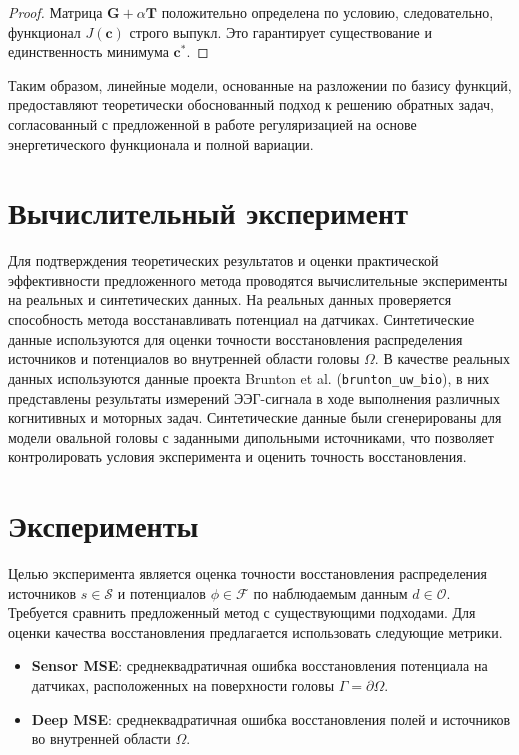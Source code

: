 \documentclass[a4paper,14pt,oneside,openany]{extarticle}
\begin{document}
\begin{proof}
Матрица $\mathbf{G} + \alpha \mathbf{T}$ положительно определена по условию, следовательно, функционал 
$J(\mathbf{c})$ строго выпукл. Это гарантирует существование и единственность минимума $\mathbf{c}^*$.
\end{proof}

Таким образом, линейные модели, основанные на разложении по базису функций, предоставляют теоретически 
обоснованный подход к решению обратных задач, согласованный с предложенной в работе регуляризацией на основе энергетического функционала и полной вариации.

\newpage
\section{Вычислительный эксперимент}

Для подтверждения теоретических результатов и оценки практической эффективности предложенного 
метода проводятся вычислительные эксперименты на реальных и синтетических данных. 
На реальных данных проверяется способность метода восстанавливать потенциал на датчиках. 
Синтетические данные используются для оценки точности 
восстановления распределения источников и потенциалов во внутренней области головы $\Omega$.
В качестве реальных данных используются данные проекта Brunton et al. (\texttt{brunton\_uw\_bio}), 
в них представлены результаты измерений ЭЭГ-сигнала в ходе выполнения различных когнитивных и 
моторных задач.
Синтетические данные были сгенерированы для модели овальной головы с заданными дипольными 
источниками, что позволяет контролировать условия эксперимента и оценить точность восстановления.

\newpage
\section{Эксперименты}
\label{sec:experiments}

 Целью эксперимента является оценка точности восстановления распределения источников $s \in \mathcal{S}$ 
 и потенциалов $\phi \in \mathcal{F}$ по наблюдаемым данным $d \in \mathcal{O}$. 
Требуется сравнить предложенный метод с существующими подходами.
Для оценки качества восстановления предлагается использовать следующие метрики.
\begin{itemize}
    \item \textbf{Sensor MSE}: среднеквадратичная ошибка восстановления потенциала на датчиках, 
    расположенных на поверхности головы $\Gamma = \partial\Omega$.
    \item \textbf{Deep MSE}: среднеквадратичная ошибка восстановления полей и источников 
    во внутренней области $\Omega$.
\end{itemize}
\end{document}
